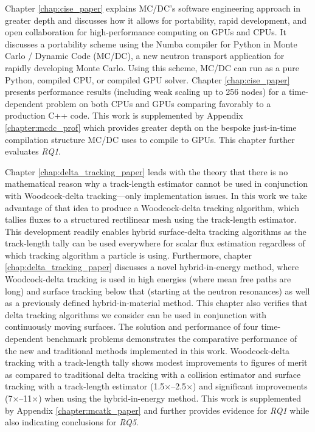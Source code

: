 Chapter \ref{chap:cise_paper} explains MC/DC's software engineering approach in greater depth and discusses how it allows for portability, rapid development, and open collaboration for high-performance computing on GPUs and CPUs. 
It discusses a portability scheme using the Numba compiler for Python in Monte Carlo / Dynamic Code (MC/DC), a new neutron transport application for rapidly developing Monte Carlo. 
Using this scheme, MC/DC can run as a pure Python, compiled CPU, or compiled GPU solver. 
Chapter \ref{chap:cise_paper} presents performance results (including weak scaling up to 256 nodes) for a time-dependent problem on both CPUs and GPUs comparing favorably to a production C++ code.
This work is supplemented by Appendix \ref{chapter:mcdc_prof} which provides greater depth on the bespoke just-in-time compilation structure MC/DC uses to compile to GPUs.
This chapter further evaluates \emph{RQ1}.

Chapter \ref{chap:delta_tracking_paper} leads with the theory that there is no mathematical reason why a track-length estimator cannot be used in conjunction with Woodcock-delta tracking---only implementation issues. 
In this work we take advantage of that idea to produce a Woodcock-delta tracking algorithm, which tallies fluxes to a structured rectilinear mesh using the track-length estimator.
This development readily enables hybrid surface-delta tracking algorithms as the track-length tally can be used everywhere for scalar flux estimation regardless of which tracking algorithm a particle is using.
Furthermore, chapter \ref{chap:delta_tracking_paper} discusses a novel hybrid-in-energy method, where Woodcock-delta tracking is used in high energies (where mean free paths are long) and surface tracking below that (starting at the neutron resonances) as well as a previously defined hybrid-in-material method.
This chapter also verifies that delta tracking algorithms we consider can be used in conjunction with continuously moving surfaces.
The solution and performance of four time-dependent benchmark problems demonstrates the comparative performance of the new and traditional methods implemented in this work.
Woodcock-delta tracking with a track-length tally shows modest improvements to figures of merit as compared to traditional delta tracking with a collision estimator and surface tracking with a track-length estimator (\num{1.5}$\times$--\num{2.5}$\times$) and significant improvements (\num{7}$\times$--\num{11}$\times$) when using the hybrid-in-energy method.
This work is supplemented by Appendix \ref{chapter:mcatk_paper} and further provides evidence for \emph{RQ1} while also indicating conclusions for \emph{RQ5}.
